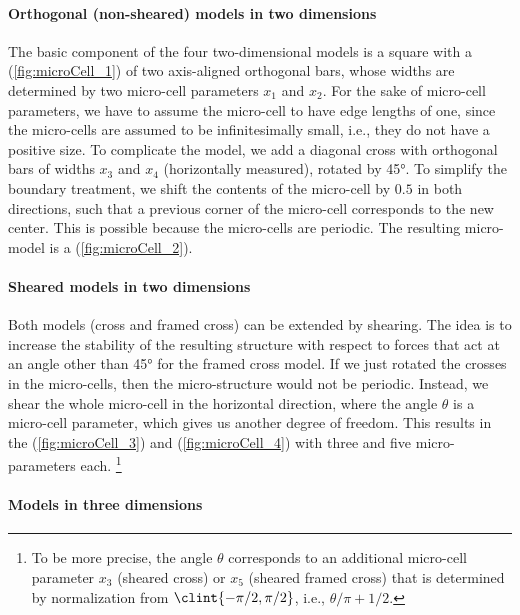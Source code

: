 \paragraph{Orthogonal (non-sheared) models in two dimensions}

The basic component of the four two-dimensional models
is a square with a  (\cref{fig:microCell_1})
of two axis-aligned orthogonal bars,
whose widths are determined by two micro-cell parameters $x_1$ and $x_2$.
For the sake of micro-cell parameters,
we have to assume the micro-cell to have edge lengths of one,
since the micro-cells are assumed to be infinitesimally small,
i.e., they do not have a positive size.
To complicate the model, we add a diagonal cross with orthogonal bars
of widths $x_3$ and $x_4$ (horizontally measured), rotated by \ang{45}.
To simplify the boundary treatment,
we shift the contents of the micro-cell by $0.5$ in both directions,
such that a previous corner of the micro-cell corresponds to the new center.
This is possible because the micro-cells are periodic.
The resulting micro-model is a  (\cref{fig:microCell_2}).

\paragraph{Sheared models in two dimensions}

Both models (cross and framed cross) can be extended by shearing.
The idea is to increase the stability of the resulting structure
with respect to forces that act at an angle other than
\ang{45} for the framed cross model.
If we just rotated the crosses in the micro-cells,
then the micro-structure would not be periodic.
Instead, we shear the whole micro-cell in the horizontal direction,
where the angle $\theta$ is a micro-cell parameter,
which gives us another degree of freedom.
This results in the  (\cref{fig:microCell_3})
and  (\cref{fig:microCell_4})
with three and five micro-parameters each.%
\footnote{%
  To be more precise, the angle $\theta$ corresponds to an
  additional micro-cell parameter $x_3$ (sheared cross) or
  $x_5$ (sheared framed cross) that is determined by normalization
  from $\clint{-\pi/2, \pi/2}$, i.e., $\theta/\pi + 1/2$.%
}

\paragraph{Models in three dimensions}

